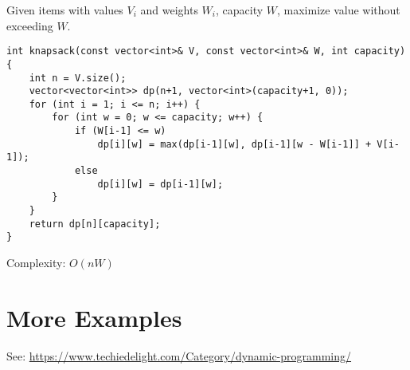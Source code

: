 \documentclass{article}
\begin{document}
Given items with values \(V_i\) and weights \(W_i\), capacity \(W\), maximize value without exceeding \(W\).

\begin{lstlisting}[style=cppstyle]
int knapsack(const vector<int>& V, const vector<int>& W, int capacity) {
    int n = V.size();
    vector<vector<int>> dp(n+1, vector<int>(capacity+1, 0));
    for (int i = 1; i <= n; i++) {
        for (int w = 0; w <= capacity; w++) {
            if (W[i-1] <= w)
                dp[i][w] = max(dp[i-1][w], dp[i-1][w - W[i-1]] + V[i-1]);
            else
                dp[i][w] = dp[i-1][w];
        }
    }
    return dp[n][capacity];
}
\end{lstlisting}

Complexity: \(O(nW)\)

\section{More Examples}

See: \url{https://www.techiedelight.com/Category/dynamic-programming/}
\end{document}
